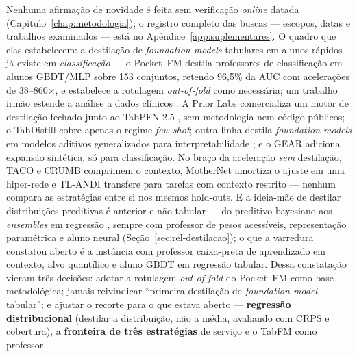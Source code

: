 Nenhuma afirmação de novidade é feita sem verificação
\emph{online} datada (Capítulo~\ref{chap:metodologia}); o registro
completo das buscas --- escopos, datas e trabalhos examinados ---
está no Apêndice~\ref{app:suplementares}. O quadro que elas
estabelecem: a destilação de \emph{foundation models} tabulares em
alunos rápidos já existe em \emph{classificação} --- o
Pocket~FM \citep{pocketfm2026} destila professores de classificação
em alunos GBDT/MLP sobre 153 conjuntos, retendo
96,5\% da AUC com acelerações de 38--860$\times$, e
estabelece a rotulagem \emph{out-of-fold} como necessária; um trabalho
irmão estende a análise a dados clínicos \citep{pocketfmhealth2026}.
A Prior Labs comercializa um motor de destilação fechado junto ao
TabPFN-2.5 \citep{priorlabs2025}, sem metodologia nem código públicos;
o TabDistill \citep{tabdistill2025} cobre apenas o regime
\emph{few-shot}; outra linha destila \emph{foundation models} em modelos
aditivos generalizados para interpretabilidade \citep{tfmgam2026}; e o
GEAR \citep{gear2026} adiciona expansão sintética, só para
classificação. No braço da aceleração \emph{sem} destilação, TACO
\citep{taco2026} e CRUMB \citep{crumb2026} comprimem o contexto,
MotherNet \citep{mothernet2023} amortiza o ajuste em uma hiper-rede e
TL-ANDI \citep{tlandi2026} transfere para tarefas com contexto
restrito --- nenhum compara as estratégias entre si nos mesmos
hold-outs. E a ideia-mãe de destilar distribuições preditivas é anterior
e não tabular --- do preditivo bayesiano \citep{korattikara2015} aos
\emph{ensembles} em regressão \citep{malinin2020rpn}, sempre com
professor de pesos acessíveis, representação paramétrica e aluno neural
(Seção~\ref{sec:rel-destilacao}); o que a varredura constatou aberto é a
instância com professor caixa-preta de aprendizado em contexto, alvo
quantílico e aluno GBDT em regressão tabular. Dessa constatação
vieram três decisões: adotar a
rotulagem \emph{out-of-fold} do Pocket~FM como base metodológica;
jamais reivindicar ``primeira destilação de \emph{foundation model}
tabular''; e ajustar o recorte para o que estava aberto ---
\textbf{regressão distribucional} (destilar a distribuição, não a
média, avaliando com CRPS e cobertura), a \textbf{fronteira de três
estratégias} de serviço e o TabFM como professor.

